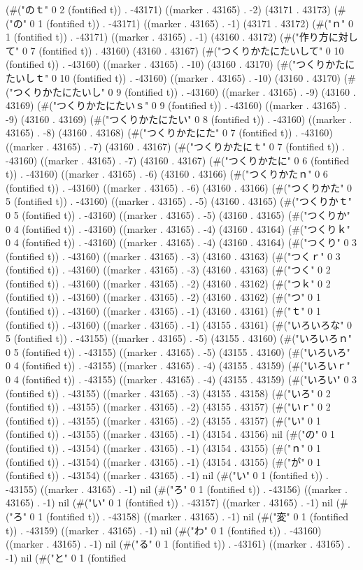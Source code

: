 (#("のｔ" 0 2 (fontified t)) . -43171) ((marker . 43165) . -2) (43171 . 43173) (#("の" 0 1 (fontified t)) . -43171) ((marker . 43165) . -1) (43171 . 43172) (#("ｎ" 0 1 (fontified t)) . -43171) ((marker . 43165) . -1) (43160 . 43172) (#("作り方に対して" 0 7 (fontified t)) . 43160) (43160 . 43167) (#("つくりかたにたいして" 0 10 (fontified t)) . -43160) ((marker . 43165) . -10) (43160 . 43170) (#("つくりかたにたいしｔ" 0 10 (fontified t)) . -43160) ((marker . 43165) . -10) (43160 . 43170) (#("つくりかたにたいし" 0 9 (fontified t)) . -43160) ((marker . 43165) . -9) (43160 . 43169) (#("つくりかたにたいｓ" 0 9 (fontified t)) . -43160) ((marker . 43165) . -9) (43160 . 43169) (#("つくりかたにたい" 0 8 (fontified t)) . -43160) ((marker . 43165) . -8) (43160 . 43168) (#("つくりかたにた" 0 7 (fontified t)) . -43160) ((marker . 43165) . -7) (43160 . 43167) (#("つくりかたにｔ" 0 7 (fontified t)) . -43160) ((marker . 43165) . -7) (43160 . 43167) (#("つくりかたに" 0 6 (fontified t)) . -43160) ((marker . 43165) . -6) (43160 . 43166) (#("つくりかたｎ" 0 6 (fontified t)) . -43160) ((marker . 43165) . -6) (43160 . 43166) (#("つくりかた" 0 5 (fontified t)) . -43160) ((marker . 43165) . -5) (43160 . 43165) (#("つくりかｔ" 0 5 (fontified t)) . -43160) ((marker . 43165) . -5) (43160 . 43165) (#("つくりか" 0 4 (fontified t)) . -43160) ((marker . 43165) . -4) (43160 . 43164) (#("つくりｋ" 0 4 (fontified t)) . -43160) ((marker . 43165) . -4) (43160 . 43164) (#("つくり" 0 3 (fontified t)) . -43160) ((marker . 43165) . -3) (43160 . 43163) (#("つくｒ" 0 3 (fontified t)) . -43160) ((marker . 43165) . -3) (43160 . 43163) (#("つく" 0 2 (fontified t)) . -43160) ((marker . 43165) . -2) (43160 . 43162) (#("つｋ" 0 2 (fontified t)) . -43160) ((marker . 43165) . -2) (43160 . 43162) (#("つ" 0 1 (fontified t)) . -43160) ((marker . 43165) . -1) (43160 . 43161) (#("ｔ" 0 1 (fontified t)) . -43160) ((marker . 43165) . -1) (43155 . 43161) (#("いろいろな" 0 5 (fontified t)) . -43155) ((marker . 43165) . -5) (43155 . 43160) (#("いろいろｎ" 0 5 (fontified t)) . -43155) ((marker . 43165) . -5) (43155 . 43160) (#("いろいろ" 0 4 (fontified t)) . -43155) ((marker . 43165) . -4) (43155 . 43159) (#("いろいｒ" 0 4 (fontified t)) . -43155) ((marker . 43165) . -4) (43155 . 43159) (#("いろい" 0 3 (fontified t)) . -43155) ((marker . 43165) . -3) (43155 . 43158) (#("いろ" 0 2 (fontified t)) . -43155) ((marker . 43165) . -2) (43155 . 43157) (#("いｒ" 0 2 (fontified t)) . -43155) ((marker . 43165) . -2) (43155 . 43157) (#("い" 0 1 (fontified t)) . -43155) ((marker . 43165) . -1) (43154 . 43156) nil (#("の" 0 1 (fontified t)) . -43154) ((marker . 43165) . -1) (43154 . 43155) (#("ｎ" 0 1 (fontified t)) . -43154) ((marker . 43165) . -1) (43154 . 43155) (#("が" 0 1 (fontified t)) . -43154) ((marker . 43165) . -1) nil (#("い" 0 1 (fontified t)) . -43155) ((marker . 43165) . -1) nil (#("ろ" 0 1 (fontified t)) . -43156) ((marker . 43165) . -1) nil (#("い" 0 1 (fontified t)) . -43157) ((marker . 43165) . -1) nil (#("ろ" 0 1 (fontified t)) . -43158) ((marker . 43165) . -1) nil (#("変" 0 1 (fontified t)) . -43159) ((marker . 43165) . -1) nil (#("わ" 0 1 (fontified t)) . -43160) ((marker . 43165) . -1) nil (#("る" 0 1 (fontified t)) . -43161) ((marker . 43165) . -1) nil (#("と" 0 1 (fontified 